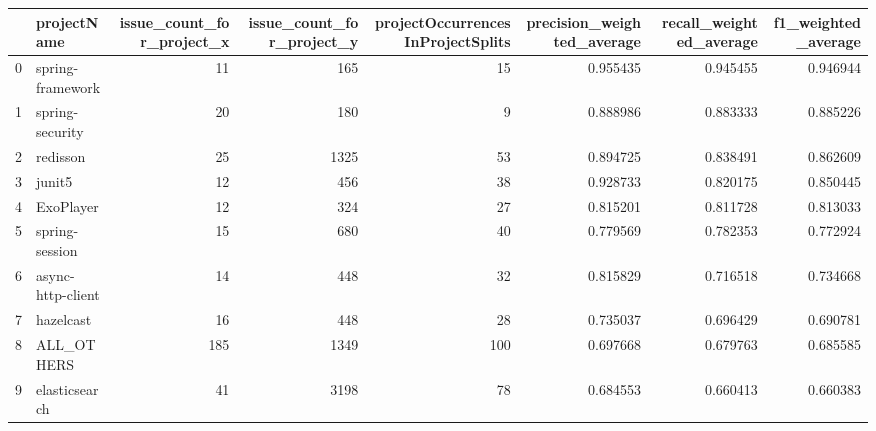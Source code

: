 \begin{tabular}{llrrrrrr}
\toprule
{} &        projectName &  issue\_count\_for\_project\_x &  issue\_count\_for\_project\_y &  projectOccurrencesInProjectSplits &  precision\_weighted\_average &  recall\_weighted\_average &  f1\_weighted\_average \\
\midrule
0  &   spring-framework &                         11 &                        165 &                                 15 &                    0.955435 &                 0.945455 &             0.946944 \\
1  &    spring-security &                         20 &                        180 &                                  9 &                    0.888986 &                 0.883333 &             0.885226 \\
2  &           redisson &                         25 &                       1325 &                                 53 &                    0.894725 &                 0.838491 &             0.862609 \\
3  &             junit5 &                         12 &                        456 &                                 38 &                    0.928733 &                 0.820175 &             0.850445 \\
4  &          ExoPlayer &                         12 &                        324 &                                 27 &                    0.815201 &                 0.811728 &             0.813033 \\
5  &     spring-session &                         15 &                        680 &                                 40 &                    0.779569 &                 0.782353 &             0.772924 \\
6  &  async-http-client &                         14 &                        448 &                                 32 &                    0.815829 &                 0.716518 &             0.734668 \\
7  &          hazelcast &                         16 &                        448 &                                 28 &                    0.735037 &                 0.696429 &             0.690781 \\
8  &         ALL\_OTHERS &                        185 &                       1349 &                                100 &                    0.697668 &                 0.679763 &             0.685585 \\
9  &      elasticsearch &                         41 &                       3198 &                                 78 &                    0.684553 &                 0.660413 &             0.660383 \\

\end{tabular}
